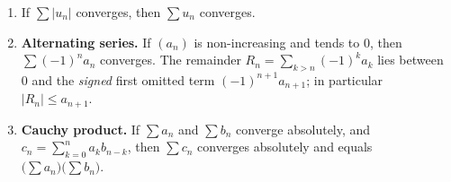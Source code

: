 \begin{proposition}\label{prop:signedseries}
\begin{enumerate}[label=(\alph*)]
\item If $\sum|u_n|$ converges, then $\sum u_n$ converges.
\item \textbf{Alternating series.} If $(a_n)$ is non-increasing and tends to $0$, then $\sum(-1)^na_n$ converges. The remainder $R_n=\sum_{k>n}(-1)^ka_k$ lies between $0$ and the \emph{signed} first omitted term $(-1)^{n+1}a_{n+1}$; in particular $|R_n|\le a_{n+1}$.
\item \textbf{Cauchy product.} If $\sum a_n$ and $\sum b_n$ converge absolutely, and $c_n=\sum_{k=0}^n a_kb_{n-k}$, then $\sum c_n$ converges absolutely and equals $\bigl(\sum a_n\bigr)\bigl(\sum b_n\bigr)$.
\end{enumerate}
\end{proposition}
